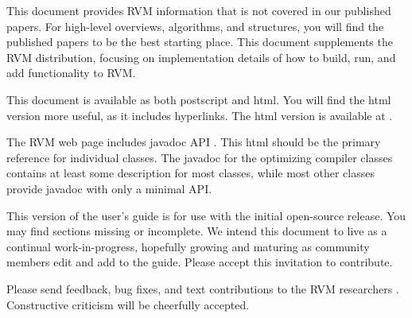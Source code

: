 This document provides RVM information that is not covered in
our published papers.  For high-level overviews, algorithms, and
structures, you will find the published papers to be the best starting
place. This document supplements
the RVM distribution, focusing on implementation
details of how to build, run, and add functionality to RVM.

This document is available as both postscript and html.  You will find the
html version more useful, as it includes hyperlinks. The html version is
available at 
\xlink{{\tt \RVMUserGuideURL}}{\RVMUserGuideURL}.

The RVM web page includes 
javadoc API 
. 
This html should be the
primary reference for individual classes.  The javadoc for the optimizing
compiler classes contains at least some description for most classes,
while most other classes provide javadoc with only a minimal API.

This version of the user's guide is for use with the initial open-source
release.  You may find sections missing or incomplete. We intend this
document to live as a continual work-in-progress, hopefully growing
and maturing as community members edit and add to the
guide.  Please accept this invitation to contribute.

Please send feedback, bug fixes, and text contributions to the RVM
researchers 
.  
Constructive criticism will be cheerfully 
accepted. 
